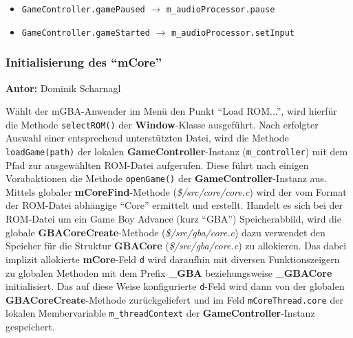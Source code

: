 \documentclass[11pt,a4paper]{scrartcl}
\newcommand{\AutorDominik} {
    \vspace{-4mm}
    \large \textbf{Autor:} Dominik Scharnagl \normalsize
    \vspace{2mm}
}
\begin{document}
\begin{itemize}
    \item \verb|GameController.gamePaused| $\rightarrow$ \verb|m_audioProcessor.pause|
    \item \verb|GameController.gameStarted| $\rightarrow$ \verb|m_audioProcessor.setInput|
\end{itemize}

\subsubsection{Initialisierung des \enquote{mCore}}
\AutorDominik

W\"ahlt der mGBA-Anwender im Men\"u den Punkt \enquote{Load ROM...}, wird hierf\"ur die Methode \verb|selectROM()| der \textbf{Window}-Klasse ausgef\"uhrt. Nach erfolgter Auswahl einer entsprechend unterst\"utzten Datei, wird die Methode \verb|loadGame(path)|  der lokalen \textbf{GameController}-Instanz (\verb|m_controller|) mit dem Pfad zur ausgew\"ahlten ROM-Datei aufgerufen. Diese f\"uhrt nach einigen Vorabaktionen die Methode \verb|openGame()| der \textbf{GameController}-Instanz aus. Mittels globaler \textbf{mCoreFind}-Methode (\textit{\$/src/core/core.c}) wird der vom Format der ROM-Datei abh\"angige \enquote{Core} ermittelt und erstellt. Handelt es sich bei der ROM-Datei um ein Game Boy Advance (kurz \enquote{GBA}) Speicherabbild, wird die globale \textbf{GBACoreCreate}-Methode (\textit{\$/src/gba/core.c}) dazu verwendet den Speicher f\"ur die Struktur \textbf{GBACore} (\textit{\$/src/gba/core.c}) zu allokieren. Das dabei implizit allokierte \textbf{mCore}-Feld \verb|d| wird daraufhin mit diversen Funktionszeigern zu globalen Methoden mit dem Prefix \textbf{{\_}GBA} beziehungsweise \textbf{{\_}GBACore} initialisiert. Das auf diese Weise konfigurierte \verb|d|-Feld wird dann von der globalen \textbf{GBACoreCreate}-Methode zur\"uckgeliefert und im Feld \verb|mCoreThread.core| der lokalen Membervariable \verb|m_threadContext| der \textbf{GameController}-Instanz gespeichert.
\end{document}
